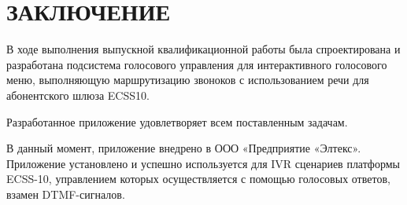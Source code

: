 \chapter{ЗАКЛЮЧЕНИЕ}

В ходе выполнения выпускной квалификационной работы была спроектирована и
разработана подсистема голосового управления для интерактивного голосового меню,
выполняющую маршрутизацию звоноков с использованием речи для абонентского шлюза ECSS10.

Разработанное приложение удовлетворяет всем поставленным задачам.

В данный момент, приложение внедрено в ООО «Предприятие «Элтекс».
Приложение установлено и успешно используется для IVR сценариев платформы ECSS-10,
управлением которых осуществляется с помощью голосовых ответов, взамен DTMF-сигналов.
